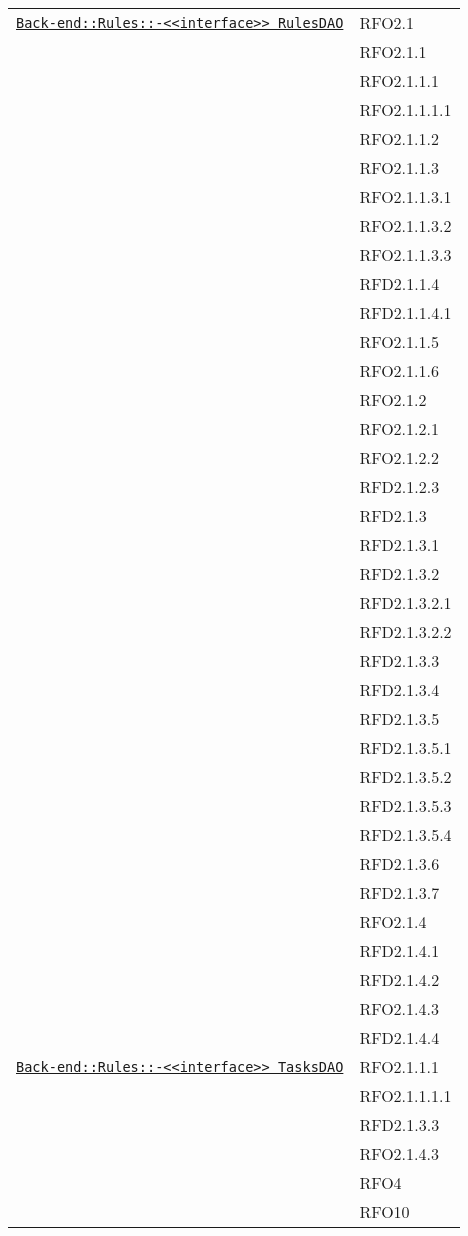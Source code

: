 \begin{longtable}{|>{\centering}m{10cm}|m{3cm}<{\centering}|}
\hyperref[Back-end::Rules::<<interface>> RulesDAO]{\texttt{Back-end::Rules::-\linebreak <<interface>> RulesDAO}} & RFO2.1\\
& RFO2.1.1\\
& RFO2.1.1.1\\
& RFO2.1.1.1.1\\
& RFO2.1.1.2\\
& RFO2.1.1.3\\
& RFO2.1.1.3.1\\
& RFO2.1.1.3.2\\
& RFO2.1.1.3.3\\
& RFD2.1.1.4\\
& RFD2.1.1.4.1\\
& RFO2.1.1.5\\
& RFO2.1.1.6\\
& RFO2.1.2\\
& RFO2.1.2.1\\
& RFO2.1.2.2\\
& RFD2.1.2.3\\
& RFD2.1.3\\
& RFD2.1.3.1\\
& RFD2.1.3.2\\
& RFD2.1.3.2.1\\
& RFD2.1.3.2.2\\
& RFD2.1.3.3\\
& RFD2.1.3.4\\
& RFD2.1.3.5\\
& RFD2.1.3.5.1\\
& RFD2.1.3.5.2\\
& RFD2.1.3.5.3\\
& RFD2.1.3.5.4\\
& RFD2.1.3.6\\
& RFD2.1.3.7\\
& RFO2.1.4\\
& RFD2.1.4.1\\
& RFD2.1.4.2\\
& RFO2.1.4.3\\
& RFD2.1.4.4\\ \hline

\hyperref[Back-end::Rules::<<interface>> TasksDAO]{\texttt{Back-end::Rules::-\linebreak <<interface>> TasksDAO}} & RFO2.1.1.1\\
& RFO2.1.1.1.1\\
& RFD2.1.3.3\\
& RFO2.1.4.3\\
& RFO4\\
& RFO10\\ \hline


\end{longtable}

